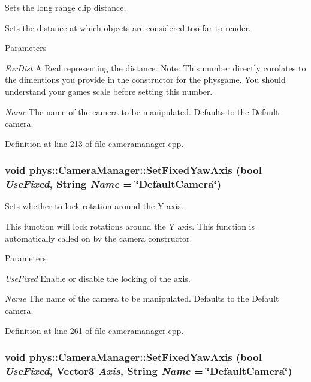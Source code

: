 Sets the long range clip distance. 

Sets the distance at which objects are considered too far to render. 
\begin{DoxyParams}{Parameters}
\item[{\em FarDist}]A Real representing the distance. Note: This number directly corolates to the dimentions you provide in the constructor for the physgame. You should understand your games scale before setting this number. \item[{\em Name}]The name of the camera to be manipulated. Defaults to the Default camera. \end{DoxyParams}


Definition at line 213 of file cameramanager.cpp.

\hypertarget{classphys_1_1CameraManager_aa7370f2239e88ab151b72c4171afea07}{
\subsubsection[{SetFixedYawAxis}]{\setlength{\rightskip}{0pt plus 5cm}void phys::CameraManager::SetFixedYawAxis (bool {\em UseFixed}, \/  {\bf String} {\em Name} = {\ttfamily \char`\"{}DefaultCamera\char`\"{}})}}
\label{d9/d91/classphys_1_1CameraManager_aa7370f2239e88ab151b72c4171afea07}


Sets whether to lock rotation around the Y axis. 

This function will lock rotations around the Y axis. This function is automatically called on by the camera constructor. 
\begin{DoxyParams}{Parameters}
\item[{\em UseFixed}]Enable or disable the locking of the axis. \item[{\em Name}]The name of the camera to be manipulated. Defaults to the Default camera. \end{DoxyParams}


Definition at line 261 of file cameramanager.cpp.

\hypertarget{classphys_1_1CameraManager_ac29a1b3cd34ff2810bee170aa233c77e}{
\subsubsection[{SetFixedYawAxis}]{\setlength{\rightskip}{0pt plus 5cm}void phys::CameraManager::SetFixedYawAxis (bool {\em UseFixed}, \/  {\bf Vector3} {\em Axis}, \/  {\bf String} {\em Name} = {\ttfamily \char`\"{}DefaultCamera\char`\"{}})}}
\label{d9/d91/classphys_1_1CameraManager_ac29a1b3cd34ff2810bee170aa233c77e}


